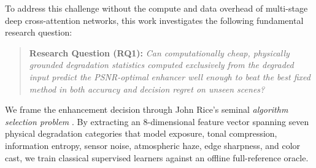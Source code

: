 \documentclass[journal]{IEEEtran}
\begin{document}
To address this challenge without the compute and data overhead of multi-stage deep cross-attention networks, this work investigates the following fundamental research question:
\begin{quote}
\textbf{Research Question (RQ1):} \textit{Can computationally cheap, physically grounded degradation statistics computed exclusively from the degraded input predict the PSNR-optimal enhancer well enough to beat the best fixed method in both accuracy and decision regret on unseen scenes?}
\end{quote}

We frame the enhancement decision through John Rice's seminal \textit{algorithm selection problem} \cite{rice1976algorithm}. By extracting an 8-dimensional feature vector spanning seven physical degradation categories that model exposure, tonal compression, information entropy, sensor noise, atmospheric haze, edge sharpness, and color cast, we train classical supervised learners against an offline full-reference oracle.
\end{document}
